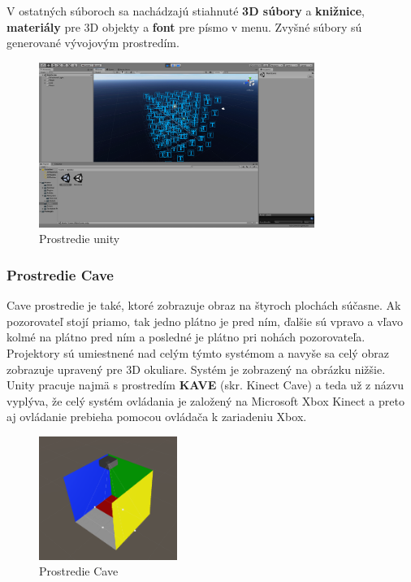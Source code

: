 V ostatných súboroch sa nachádzajú stiahnuté \textbf{3D súbory} a \textbf{knižnice}, \textbf{materiály} pre 3D objekty
a \textbf{font} pre písmo v menu.
Zvyšné súbory sú generované vývojovým prostredím.

\begin{figure}[H]
    \centering
    \includegraphics[width=0.8\textwidth]{images/unity.png}
    \caption{Prostredie unity}
\end{figure}\label{figure:unity}

\subsubsection{Prostredie Cave}
Cave prostredie je také, ktoré zobrazuje obraz na štyroch plochách súčasne.
Ak pozorovateľ stojí priamo, tak jedno plátno je pred ním, ďalšie sú vpravo a vľavo kolmé na plátno pred ním a posledné
je plátno pri nohách pozorovateľa.
Projektory sú umiestnené nad celým týmto systémom a navyše sa celý obraz zobrazuje upravený pre 3D okuliare.
Systém je zobrazený na obrázku nižšie.
Unity pracuje najmä s prostredím \textbf{KAVE} (skr. Kinect Cave) a teda už z názvu vyplýva, že celý systém ovládania
je založený na Microsoft Xbox Kinect a preto aj ovládanie prebieha pomocou ovládača k zariadeniu Xbox.

\begin{figure}[H]
    \centering
    \includegraphics[width=0.4\textwidth]{images/kave.png}
    \caption{Prostredie Cave}
\end{figure}

